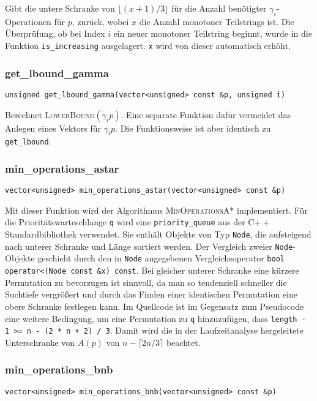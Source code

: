 \documentclass[a4paper, 10pt, ngerman]{article}
\begin{document}
\noindent Gibt die untere Schranke von $\lfloor (x + 1)/ 3 \rfloor$ für die Anzahl benötigter $\gamma_i$-Operationen für $p$, zurück, wobei $x$ die Anzahl monotoner Teilstrings ist. Die Überprüfung, ob bei Index $i$ ein neuer monotoner Teilstring beginnt, wurde in die Funktion \verb|is_increasing| ausgelagert. \verb|x| wird von dieser automatisch erhöht.

\subsubsection{get\_lbound\_gamma}
\verb|unsigned get_lbound_gamma(vector<unsigned> const &p, unsigned i)|
\medskip

\noindent Berechnet \textsc{LowerBound}$(\gamma_i p)$. Eine separate Funktion dafür vermeidet das Anlegen eines Vektors für $\gamma_i p$. Die Funktionsweise ist aber identisch zu \verb|get_lbound|.

\subsubsection{min\_operations\_astar}
\verb|vector<unsigned> min_operations_astar(vector<unsigned> const &p)|
\medskip

\noindent Mit dieser Funktion wird der Algorithmus \textsc{MinOperationsA*} implementiert. Für die Prioritätswarteschlange \verb|q| wird eine \verb|priority_queue| aus der C$++$ Standardbibliothek verwendet. Sie enthält Objekte von Typ \verb|Node|, die aufsteigend nach unterer Schranke und Länge sortiert werden. Der Vergleich zweier \verb|Node|-Objekte geschieht durch den in \verb|Node| angegebenen Vergleichsoperator \verb|bool operator<(Node const &x) const|. Bei gleicher unterer Schranke eine kürzere Permutation zu bevorzugen ist sinnvoll, da man so tendenziell schneller die Suchtiefe vergrößert und durch das Finden einer identischen Permutation eine obere Schranke festlegen kann. Im Quellcode ist im Gegensatz zum Pseudocode eine weitere Bedingung, um eine Permutation zu \verb|q| hinzuzufügen, dass \verb|length - 1 >= n - (2 * n + 2) / 3|. Damit wird die in der Laufzeitanalyse hergeleitete Unterschranke von $A(p)$ von $n - \lceil 2n/3 \rceil$ beachtet.

\subsubsection{min\_operations\_bnb}
\verb|vector<unsigned> min_operations_bnb(vector<unsigned> const &p)|
\medskip
\end{document}
